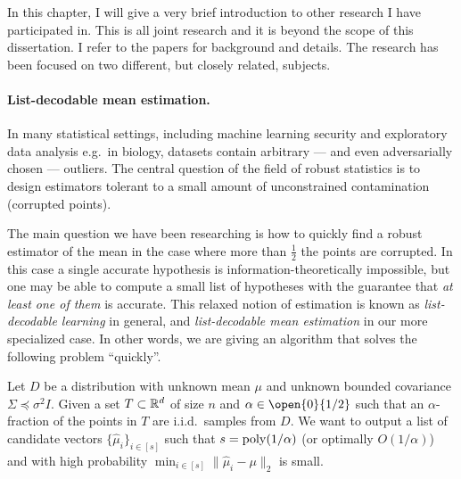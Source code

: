 
In this chapter, I will give a very brief introduction to other research I have participated in. This is all joint research and it is beyond the scope of this dissertation. I refer to the papers \cite{robstat1,robstat2,robstat3} for background and details. The research has been focused on two different, but closely related, subjects.

\paragraph{List-decodable mean estimation.}
In many statistical settings, including machine learning security and exploratory data analysis e.g.\ in biology,
datasets contain arbitrary --- and even adversarially chosen --- outliers.
The central question of the field of robust statistics is to design estimators tolerant to a small amount of unconstrained contamination (corrupted points).

The main question we have been researching is how to quickly find a robust estimator of the mean in the case where more than $\frac{1}{2}$ the points are corrupted. In this case a single accurate hypothesis is information-theoretically impossible, but one may be able to compute a small list of hypotheses with the guarantee that \emph{at least one of them} is accurate. This relaxed notion of estimation is known as \emph{list-decodable learning} in general, and \emph{list-decodable mean estimation} in our more specialized case. In other words, we are giving an algorithm that solves the following problem ``quickly''.

Let $D$ be a distribution with unknown mean $\mu$ and unknown bounded covariance $\Sigma \preceq \sigma^2 I$. Given a set $T \subset \mathbb{R}^d$ of size $n$ and $\alpha \in \open{0}{1/2}$ such that an $\alpha$-fraction of the points in $T$ are i.i.d.\ samples from $D$. We want to output a list of candidate vectors $\{\widehat{\mu}_i \}_{i \in [s]}$ such that $s = \operatorname{poly}(1/\alpha)$ (or optimally $O(1/\alpha)$) and with high probability $\min_{i \in [s]} \|\widehat{\mu}_i - \mu \|_2$ is small.

